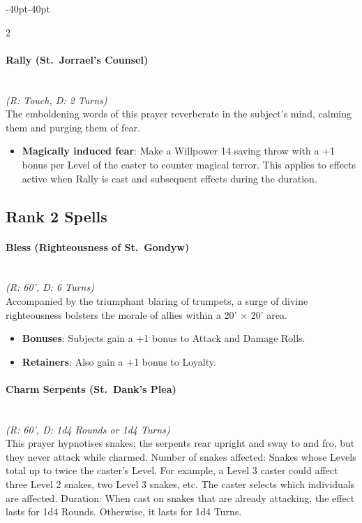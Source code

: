 \documentclass{book}
\providecommand{\tightlist}{%
\setlength{\itemsep}{0pt}\setlength{\parskip}{0pt}}
\begin{document}
\begin{adjustwidth}{-40pt}{-40pt}
\begin{multicols}{2}
\paragraph{Rally (St.~Jorrael's
	Counsel)}\label{rally-st.-jorraels-counsel}\mbox{}\\
\emph{(R: Touch, D: 2 Turns)}\\
The emboldening words of this prayer reverberate in the subject's mind,
calming them and purging them of fear.

\begin{itemize}
	\tightlist
	\item
	\textbf{Magically induced fear}: Make a Willpower 14 saving throw with
	a +1 bonus per Level of the caster to counter magical terror. This
	applies to effects active when Rally is cast and subsequent effects
	during the duration.
\end{itemize}

\subsection*{Rank 2 Spells}\label{rank-2-holy}

\paragraph{Bless (Righteousness of
	St.~Gondyw)}\label{bless-righteousness-of-st.-gondyw}\mbox{}\\
\emph{(R: 60', D: 6 Turns)}\\
Accompanied by the triumphant blaring of trumpets, a surge of divine
righteousness bolsters the morale of allies within a 20' × 20' area.

\begin{itemize}
	\tightlist
	\item
	\textbf{Bonuses}: Subjects gain a +1 bonus to Attack and Damage Rolls.
	\item
	\textbf{Retainers}: Also gain a +1 bonus to Loyalty.
\end{itemize}

\paragraph{Charm Serpents (St.~Dank's
	Plea)}\label{charm-serpents-st.-danks-plea}\mbox{}\\
\emph{(R: 60', D: 1d4 Rounds or 1d4 Turns)}\\
This prayer hypnotises snakes; the serpents rear upright and sway to and
fro, but they never attack while charmed. Number of snakes affected:
Snakes whose Levels total up to twice the caster's Level. For example, a
Level 3 caster could affect three Level 2 snakes, two Level 3 snakes,
etc. The caster selects which individuals are affected. Duration: When
cast on snakes that are already attacking, the effect lasts for 1d4
Rounds. Otherwise, it lasts for 1d4 Turns.


\end{multicols}
\end{adjustwidth}
\end{document}
